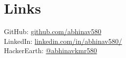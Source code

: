 \documentclass[letterpaper]{deedy-resume} %
\begin{document}
\begin{minipage}[t]{0.33\textwidth}
\sectionspace %

\section{Links} 

GitHub: \href{https://github.com/abhinav580}{github.com/abhinav580} \\
LinkedIn: \href{https://www.linkedin.com/in/abhinav580/}{linkedin.com/in/abhinav580/}  \\
HackerEarth: \href{https://www.hackerearth.com/@abhinavkmr580}{@abhinavkmr580} \\



\sectionspace %


\end{minipage} %
\hfill
%
%
\end{document}
